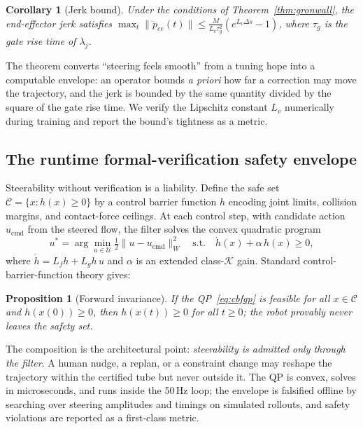 \documentclass[11pt,a4paper]{article}
\newtheorem{proposition}{Proposition}
\newtheorem{corollary}{Corollary}
\begin{document}
\begin{corollary}[Jerk bound]
\label{cor:jerk}
Under the conditions of Theorem~\ref{thm:gronwall}, the end-effector jerk
satisfies $\max_t \|\dddot{p}_{ee}(t)\| \le \frac{M}{L_v \tau_g^2}(e^{L_v \Delta s} - 1)$,
where $\tau_g$ is the gate rise time of $\lambda_j$.
\end{corollary}

The theorem converts ``steering feels smooth'' from a tuning hope into a
computable envelope: an operator bounds \emph{a priori} how far a correction may
move the trajectory, and the jerk is bounded by the same quantity divided by the
square of the gate rise time. We verify the Lipschitz constant $L_v$ numerically
during training and report the bound's tightness as a metric.

\subsection{The runtime formal-verification safety envelope}
\label{sec:safety}

Steerability without verification is a liability. Define the safe set
$\mathcal{C} = \{x : h(x) \ge 0\}$ by a control barrier function $h$ encoding
joint limits, collision margins, and contact-force ceilings. At each control
step, with candidate action $u_{\mathrm{cmd}}$ from the steered flow, the filter
solves the convex quadratic program
\begin{equation}
u^{*} = \arg\min_{u \in \mathcal{U}} \tfrac12 \| u - u_{\mathrm{cmd}} \|_W^2
\quad \text{s.t.} \quad
\dot h(x) + \alpha\, h(x) \ge 0,
\label{eq:cbfqp}
\end{equation}
where $\dot h = L_f h + L_g h\, u$ and $\alpha$ is an extended class-$\mathcal{K}$
gain. Standard control-barrier-function theory \cite{ames2014,ames2019} gives:

\begin{proposition}[Forward invariance]
\label{prop:cbf}
If the QP~\eqref{eq:cbfqp} is feasible for all $x \in \mathcal{C}$ and
$h(x(0)) \ge 0$, then $h(x(t)) \ge 0$ for all $t \ge 0$; the robot provably never
leaves the safety set.
\end{proposition}

The composition is the architectural point: \emph{steerability is admitted only
through the filter}. A human nudge, a replan, or a constraint change may reshape
the trajectory within the certified tube but never outside it. The QP is convex,
solves in microseconds, and runs inside the 50\,Hz loop; the envelope is
falsified offline by searching over steering amplitudes and timings on simulated
rollouts, and safety violations are reported as a first-class metric.
\end{document}
